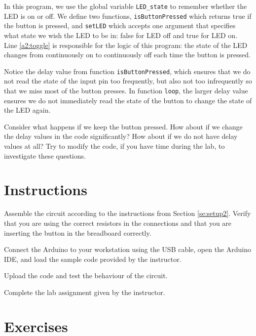 \documentclass[12pt]{book}
\begin{document}
In this program, we use the global variable \lstinline$LED_state$ to
remember whether the LED is on or off. We define two functions,
\lstinline$isButtonPressed$ which returns true if the button is
pressed, and \lstinline$setLED$ which accepts one argument that
specifies what state we wish the LED to be in: false for LED off and
true for LED on. Line \ref*{a2:toggle} is responsible for the logic of
this program: the state of the LED changes from continuously on to
continuously off each time the button is pressed. 

Notice the delay value from function \lstinline$isButtonPressed$, which
ensures that we do not read the state of the input pin too frequently,
but also not too infrequently so that we miss most of the button
presses. In function \lstinline$loop$, the larger delay value ensures
we do not immediately read the state of the button to change the state
of the LED again. 

Consider what happens if we keep the button pressed. How about if we
change the delay values in the code significantly? How about if we do
not have delay values at all? Try to modify the code, if you have time
during the lab, to investigate these questions.



\section{Instructions}

\begin{compactitem}[--]
\item Assemble the circuit according to the instructions from Section
  \ref{se:setup2}. Verify that you are using the correct resistors in
  the connections and that you are inserting the button in the
  breadboard correctly. 
\item Connect the Arduino to your workstation using the USB cable,
  open the Arduino IDE, and load the sample code provided by the
  instructor. 
\item Upload the code and test the behaviour of the circuit.
\item Complete the lab assignment given by the instructor.
\end{compactitem}

\section{Exercises}
\end{document}
